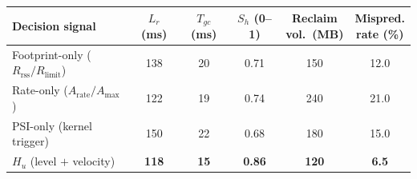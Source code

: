 \begin{tabular}{lccccc}
\toprule
Decision signal & \makecell{$L_r$\\(ms)} & \makecell{$T_{gc}$\\(ms)} & \makecell{$S_h$\\(0--1)} & \makecell{Reclaim\\vol.\ (MB)} & \makecell{Mispred.\\rate (\%)} \\
\midrule
Footprint-only ($R_{\mathrm{rss}}/R_{\mathrm{limit}}$) & 138 & 20 & 0.71 & 150 & 12.0 \\
Rate-only ($A_{\mathrm{rate}}/A_{\mathrm{max}}$) & 122 & 19 & 0.74 & 240 & 21.0 \\
PSI-only (kernel trigger) & 150 & 22 & 0.68 & 180 & 15.0 \\
$H_u$ (level $+$ velocity) & \textbf{118} & \textbf{15} & \textbf{0.86} & \textbf{120} & \textbf{6.5} \\
\bottomrule
\end{tabular}
